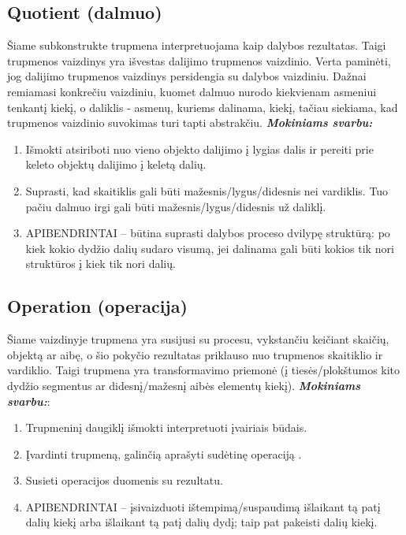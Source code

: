 \documentclass[a4paper]{article}
\begin{document}
\subsection{Quotient (dalmuo)}
Šiame subkonstrukte trupmena interpretuojama kaip dalybos rezultatas. Taigi trupmenos vaizdinys yra išvestas dalijimo trupmenos vaizdinio. Verta paminėti, jog dalijimo trupmenos vaizdinys persidengia su dalybos vaizdiniu. Dažnai remiamasi konkrečiu vaizdiniu, kuomet dalmuo nurodo kiekvienam asmeniui tenkantį kiekį, o daliklis - asmenų, kuriems dalinama, kiekį, tačiau siekiama, kad trupmenos vaizdinio suvokimas turi tapti abstrakčiu. \textbf{\textit{Mokiniams svarbu:}}
\begin{enumerate}
\item Išmokti atsiriboti nuo vieno objekto dalijimo į lygias dalis ir pereiti prie keleto objektų dalijimo į keletą dalių.
\item Suprasti, kad skaitiklis gali būti mažesnis/lygus/didesnis nei vardiklis. Tuo pačiu dalmuo irgi gali būti mažesnis/lygus/didesnis už daliklį.
\item APIBENDRINTAI –  būtina suprasti dalybos proceso dvilypę struktūrą:  po kiek kokio dydžio dalių sudaro visumą, jei dalinama gali būti kokios tik nori struktūros į kiek tik nori dalių.
\end{enumerate}

\subsection{Operation (operacija)} Šiame vaizdinyje trupmena yra susijusi su procesu, vykstančiu keičiant skaičių, objektą ar aibę, o šio pokyčio rezultatas priklauso nuo trupmenos skaitiklio ir vardiklio. Taigi trupmena yra transformavimo priemonė (į tiesės/plokštumos kito dydžio segmentus ar didesnį/mažesnį aibės elementų kiekį). \textbf{\textit{Mokiniams svarbu:}}:
\begin{enumerate}
\item Trupmeninį daugiklį išmokti interpretuoti įvairiais būdais.
\item Įvardinti trupmeną, galinčią aprašyti sudėtinę operaciją .
\item Susieti operacijos duomenis su rezultatu.
\item APIBENDRINTAI –  įsivaizduoti ištempimą/suspaudimą išlaikant tą patį dalių kiekį arba išlaikant tą patį dalių dydį; taip pat pakeisti dalių kiekį.
\end{enumerate}
\end{document}
